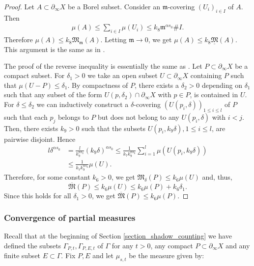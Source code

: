 \documentclass[12pt]{amsbook}%
\theoremstyle{definition}
\theoremstyle{remark}
\numberwithin{section}{chapter}
\numberwithin{subsection}{section}
\numberwithin{figure}{chapter}
\def\dyl{>0}
\def\fm{{\mathfrak{m}}}
\def\fM{{\mathfrak{M}}}
\def\geo{\partial_\infty}
\def\ol{\overline}
\def\kap{}
\begin{document}
{{\begin{proof}
Let $A\subset \geo X$ be a Borel subset. Consider an $\fm$-covering $(U_i)_{i\in I}$ of $A$. Then 
\begin{align*}
\mu(A)\leqslant \sum_{i\in I} \mu(U_i) \leqslant k_8  \fm^{\alpha s_0}\# I.
\end{align*}
Therefore $\mu(A)\leqslant k_8\fM_\fm(A)$. Letting $\fm\rightarrow 0$, we get $\mu(A)\leqslant k_8 \underline{\fM}(A)$. This argument is the same as in \cite{sullivan_density}.

The proof of the reverse inequality is essentially the same as \cite[Corollary 2.5.10]{Calegari}. Let $P\subset \geo X$ be a compact subset. For $\delta_1\dyl$ we take an open subset $U\subset \geo X$ containing $P$ such that $\mu(U-P)\leqslant \delta_1$. By compactness of $P$, there exists a $\delta_2\dyl$ depending on $\delta_1$ such that any subset of the form $U(p,\delta_2)\cap \geo X$ with $p\in P$, is contained in $U$. For 
$\delta\leqslant \delta_2$ we can inductively construct a $\delta$-covering $(U(p_i,\delta))_{1\leqslant i\leqslant l}$ of $P$ such that each $p_j$ belongs to $P$ but does not belong to any $U(p_i,\delta)$ with $i<j$. Then, there exists $k_9\dyl$ such that the subsets $U(p_i,k_9\delta),1\leqslant i \leqslant l$, are pairwise disjoint. Hence
\begin{align*}
l\delta^{\alpha s_0}& =\frac{l}{k_9^{\alpha s_0}}(k_9\delta)^{\alpha s_0}
\leqslant \frac{1}{k_7k_9^{\alpha s_0}}\sum_{i=1}^l  \mu\left(U(p_i,k_9\delta)\right)\\
&\leqslant \frac{1}{k_7k_9^{{\kap \alpha}s_0}}\mu(U).
\end{align*}
Therefore, for some constant $k_6\dyl$, we get $\fM_\delta(P)\leqslant k_6\mu(U)$ and, thus,  
$$
\ol{\fM}(P)\leqslant k_6\mu(U) \le  k_6\mu(P) + k_6\delta_1. 
$$ 
Since this holds for all $\delta_1>0$, %
we get $\ol{\fM}(P)\leqslant k_6\mu(P)$. 
\end{proof}





\subsubsection{Convergence of partial measures}

Recall that at the beginning of Section \ref{section_shadow_counting} we have defined the subsets $\Gamma_{P,t},\Gamma_{P,E,t}$ of $\Gamma$ for any $t > 0$, any compact $P\subset \geo X$ and any finite subset $E\subset \Gamma$. Fix $P,E$ and let $\mu_{s,t}$ be the measure given by:

}}
\end{document}
